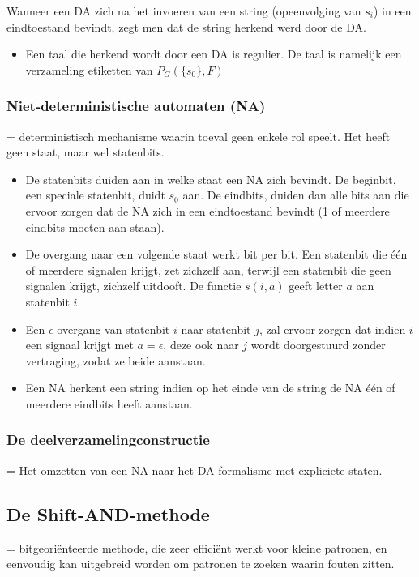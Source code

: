 \documentclass{report}
\begin{document}
Wanneer een DA zich na het invoeren van een string (opeenvolging van $s_i$) in een eindtoestand bevindt, zegt men dat de string herkend werd door de DA.

\begin{itemize}
	\item[\info] Een taal die herkend wordt door een DA is regulier. De taal is namelijk een verzameling etiketten van $P_G(\{s_0\}, F)$
\end{itemize}


\subsubsection{Niet-deterministische automaten (NA)}
= deterministisch mechanisme waarin toeval geen enkele rol speelt. Het heeft geen staat, maar wel statenbits.
\begin{itemize}
	\item[\info] De statenbits duiden aan in welke staat een NA zich bevindt. De beginbit, een speciale statenbit, duidt $s_0$ aan. De eindbits, duiden dan alle bits aan die ervoor zorgen dat de NA zich in een eindtoestand bevindt (1 of meerdere eindbits moeten aan staan).
	\item[\info] De overgang naar een volgende staat werkt bit per bit. Een statenbit die één of meerdere signalen krijgt, zet zichzelf aan, terwijl een statenbit die geen signalen krijgt, zichzelf uitdooft. De functie $s(i, a)$ geeft letter $a$ aan statenbit $i$.
	\item[\info] Een $\epsilon$-overgang van statenbit $i$ naar statenbit $j$, zal ervoor zorgen dat indien $i$ een signaal krijgt met $a = \epsilon$, deze ook naar $j$ wordt doorgestuurd zonder vertraging, zodat ze beide aanstaan.
	\item[\info] Een NA herkent een string indien op het einde van de string de NA één of meerdere eindbits heeft aanstaan.
\end{itemize}

\subsubsection{De deelverzamelingconstructie}
= Het omzetten van een NA naar het DA-formalisme met expliciete staten.
\subsection{De Shift-AND-methode}
= bitgeoriënteerde methode, die zeer efficiënt werkt voor kleine patronen, en eenvoudig kan uitgebreid worden om patronen te zoeken waarin fouten zitten.
\end{document}
